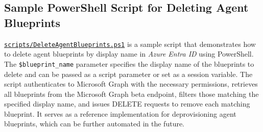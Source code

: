 \documentclass[9pt]{extarticle}%
\begin{document}
\subsection{Sample PowerShell Script for Deleting Agent Blueprints}%
\href{https://github.com/dennisseah/agent-identity/blob/main/scripts/DeleteAgentBlueprints.ps1}{\texttt{scripts/DeleteAgentBlueprints.ps1}} is a sample script that demonstrates how to delete agent blueprints by display name in \textit{Azure Entra ID} using PowerShell. The \texttt{\$blueprint\_name} parameter specifies the display name of the blueprints to delete and can be passed as a script parameter or set as a session variable. The script authenticates to Microsoft Graph with the necessary permissions, retrieves all blueprints from the Microsoft Graph beta endpoint, filters those matching the specified display name, and issues DELETE requests to remove each matching blueprint. It serves as a reference implementation for deprovisioning agent blueprints, which can be further automated in the future.
%
\par\vspace{\baselineskip}%
\end{document}
